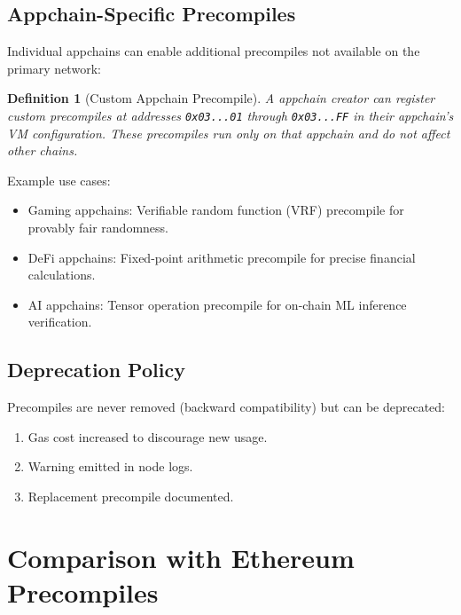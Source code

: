 \documentclass[11pt,a4paper]{article}
\newtheorem{definition}{Definition}
\begin{document}
\subsection{Appchain-Specific Precompiles}

Individual appchains can enable additional precompiles not available on the primary network:

\begin{definition}[Custom Appchain Precompile]
A appchain creator can register custom precompiles at addresses \texttt{0x03...01} through \texttt{0x03...FF} in their appchain's VM configuration. These precompiles run only on that appchain and do not affect other chains.
\end{definition}

Example use cases:
\begin{itemize}
    \item Gaming appchains: Verifiable random function (VRF) precompile for provably fair randomness.
    \item DeFi appchains: Fixed-point arithmetic precompile for precise financial calculations.
    \item AI appchains: Tensor operation precompile for on-chain ML inference verification.
\end{itemize}

\subsection{Deprecation Policy}

Precompiles are never removed (backward compatibility) but can be deprecated:
\begin{enumerate}
    \item Gas cost increased to discourage new usage.
    \item Warning emitted in node logs.
    \item Replacement precompile documented.
\end{enumerate}

\section{Comparison with Ethereum Precompiles}\label{sec:comparison}
\end{document}
